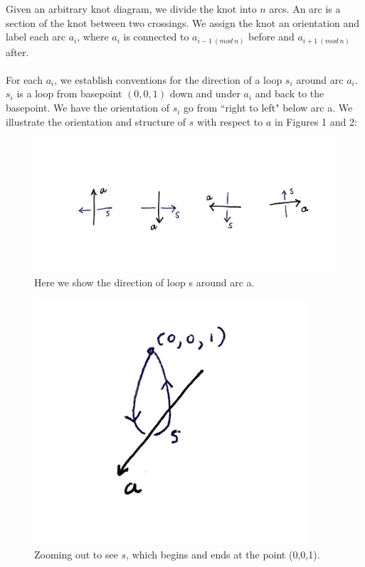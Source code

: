 \documentclass{article}
\begin{document}
\begin{definition}
Given an arbitrary knot diagram, we divide the knot into $n$ arcs. An arc is a section of the knot between two crossings. We assign the knot an orientation and label each arc $a_i$, where $a_i$ is connected to $a_{i - 1\ (mod\ n)}$ before and $a_{i + 1\ (mod\ n)}$ after.\\\\
For each $a_i$,  we establish conventions for the direction of a loop $s_i$ around arc $a_i$. $s_i$ is a loop from basepoint $(0, 0, 1)$ down and under $a_i$ and back to the basepoint. We have the orientation of $s_i$ go from ``right to left" below arc a. We illustrate the orientation and structure of $s$ with respect to $a$ in Figures 1 and 2:

\begin{figure}[h!]
		\centering
		\captionsetup{width=.75\linewidth}
		\includegraphics[width=6in]{figures/orientations.png}
		\caption{Here we show the direction of loop s around arc a.}
		\label{fig:rtinstability}
\end{figure}

\begin{figure}[h!]
	\centering
	\captionsetup{width=.75\linewidth}
	\includegraphics[width=4in]{figures/s_loop.png}
	\caption{Zooming out to see $s$, which begins and ends at the point (0,0,1).}
	\label{fig:rtinstability}
\end{figure}


\end{definition}
\end{document}
